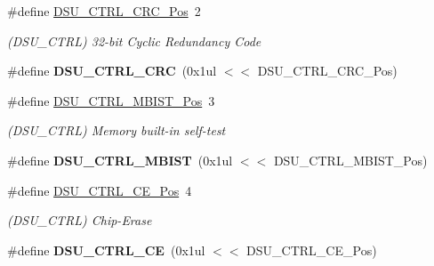 \begin{DoxyCompactItemize}
\item 
\hypertarget{group___s_a_m_l21___d_s_u_ga3f42a18f629eccf5698c46d591b827bc}{}\#define \hyperlink{group___s_a_m_l21___d_s_u_ga3f42a18f629eccf5698c46d591b827bc}{D\+S\+U\+\_\+\+C\+T\+R\+L\+\_\+\+C\+R\+C\+\_\+\+Pos}~2\label{group___s_a_m_l21___d_s_u_ga3f42a18f629eccf5698c46d591b827bc}

\begin{DoxyCompactList}\small\item\em (D\+S\+U\+\_\+\+C\+T\+R\+L) 32-\/bit Cyclic Redundancy Code \end{DoxyCompactList}\item 
\hypertarget{group___s_a_m_l21___d_s_u_gaa949503f8848f8d688497ed13a2e29b1}{}\#define {\bfseries D\+S\+U\+\_\+\+C\+T\+R\+L\+\_\+\+C\+R\+C}~(0x1ul $<$$<$ D\+S\+U\+\_\+\+C\+T\+R\+L\+\_\+\+C\+R\+C\+\_\+\+Pos)\label{group___s_a_m_l21___d_s_u_gaa949503f8848f8d688497ed13a2e29b1}

\item 
\hypertarget{group___s_a_m_l21___d_s_u_gae2f8bb8c8fde9739e8e15e76b5a052fc}{}\#define \hyperlink{group___s_a_m_l21___d_s_u_gae2f8bb8c8fde9739e8e15e76b5a052fc}{D\+S\+U\+\_\+\+C\+T\+R\+L\+\_\+\+M\+B\+I\+S\+T\+\_\+\+Pos}~3\label{group___s_a_m_l21___d_s_u_gae2f8bb8c8fde9739e8e15e76b5a052fc}

\begin{DoxyCompactList}\small\item\em (D\+S\+U\+\_\+\+C\+T\+R\+L) Memory built-\/in self-\/test \end{DoxyCompactList}\item 
\hypertarget{group___s_a_m_l21___d_s_u_ga29a4889c6f02e7f58d390da5cb809eab}{}\#define {\bfseries D\+S\+U\+\_\+\+C\+T\+R\+L\+\_\+\+M\+B\+I\+S\+T}~(0x1ul $<$$<$ D\+S\+U\+\_\+\+C\+T\+R\+L\+\_\+\+M\+B\+I\+S\+T\+\_\+\+Pos)\label{group___s_a_m_l21___d_s_u_ga29a4889c6f02e7f58d390da5cb809eab}

\item 
\hypertarget{group___s_a_m_l21___d_s_u_gaef5ca1fd2f78e579bae1661fb54ccae7}{}\#define \hyperlink{group___s_a_m_l21___d_s_u_gaef5ca1fd2f78e579bae1661fb54ccae7}{D\+S\+U\+\_\+\+C\+T\+R\+L\+\_\+\+C\+E\+\_\+\+Pos}~4\label{group___s_a_m_l21___d_s_u_gaef5ca1fd2f78e579bae1661fb54ccae7}

\begin{DoxyCompactList}\small\item\em (D\+S\+U\+\_\+\+C\+T\+R\+L) Chip-\/\+Erase \end{DoxyCompactList}\item 
\hypertarget{group___s_a_m_l21___d_s_u_ga5e11b643b12c8d48be1e324bc42008b6}{}\#define {\bfseries D\+S\+U\+\_\+\+C\+T\+R\+L\+\_\+\+C\+E}~(0x1ul $<$$<$ D\+S\+U\+\_\+\+C\+T\+R\+L\+\_\+\+C\+E\+\_\+\+Pos)\label{group___s_a_m_l21___d_s_u_ga5e11b643b12c8d48be1e324bc42008b6}


\end{DoxyCompactItemize}
